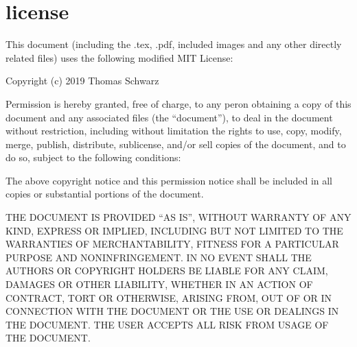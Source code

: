 \documentclass[11pt, titlepage]{article}
\begin{document}
	
\section{license}
\label{sec:license}
This document (including the .tex, .pdf, included images and any other directly related files) uses the following modified MIT License:

Copyright (c) 2019 Thomas Schwarz

Permission is hereby granted, free of charge, to any peron obtaining a copy of this document and any associated files (the ``document''), to deal in the document without restriction, including without limitation the rights to use, copy, modify, merge, publish, distribute, sublicense, and/or sell copies of the document, and to do so, subject to the following conditions:

The above copyright notice and this permission notice shall be included in all copies or substantial portions of the document.

THE DOCUMENT IS PROVIDED ``AS IS'', WITHOUT WARRANTY OF ANY KIND, EXPRESS OR IMPLIED, INCLUDING BUT NOT LIMITED TO THE WARRANTIES OF MERCHANTABILITY, FITNESS FOR A PARTICULAR PURPOSE AND NONINFRINGEMENT. IN NO EVENT SHALL THE AUTHORS OR COPYRIGHT HOLDERS BE LIABLE FOR ANY CLAIM, DAMAGES OR OTHER LIABILITY, WHETHER IN AN ACTION OF CONTRACT, TORT OR OTHERWISE, ARISING FROM, OUT OF OR IN CONNECTION WITH THE DOCUMENT OR THE USE OR DEALINGS IN THE DOCUMENT. THE USER ACCEPTS ALL RISK FROM USAGE OF THE DOCUMENT.
\end{document}
